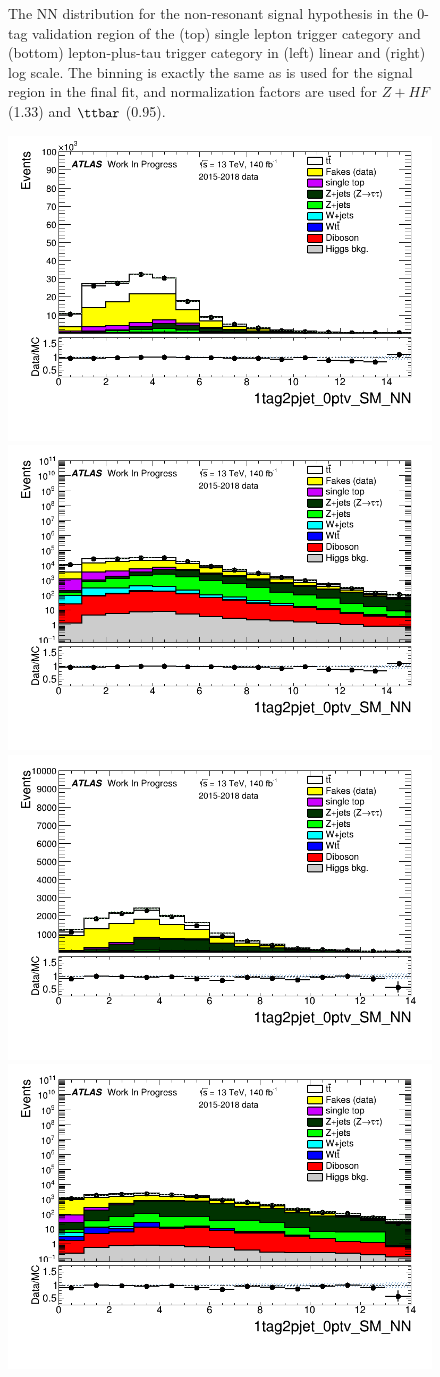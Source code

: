 \begin{figure}
\caption{The NN distribution for the non-resonant signal hypothesis in the $0$-tag validation region of the (top) single lepton trigger category and (bottom) lepton-plus-tau trigger category in (left) linear and (right) log scale. The binning is exactly the same as is used for the signal region in the final fit, and normalization factors are used for $Z+HF$ (1.33) and $\ttbar$ (0.95).}
\label{fig:SLT_LTT_0tag_SR}
\end{figure}

\begin{figure}
\centering
\includegraphics[width=.45\textwidth]{figures/lephadFF/SLT/1tag2pjet_0ptv_SM_NN_SLT_ALLFAKES_Bulb_SRbinning_lin.png}
\includegraphics[width=.45\textwidth]{figures/lephadFF/SLT/1tag2pjet_0ptv_SM_NN_SLT_ALLFAKES_Bulb_SRbinning_log.png}\\
\includegraphics[width=.45\textwidth]{figures/lephadFF/LTT/1tag2pjet_0ptv_SM_NN_LTT_ALLFAKES_Bulb_SRbinning_lin.png}
\includegraphics[width=.45\textwidth]{figures/lephadFF/LTT/1tag2pjet_0ptv_SM_NN_LTT_ALLFAKES_Bulb_SRbinning_log.png}\\

\end{figure}

